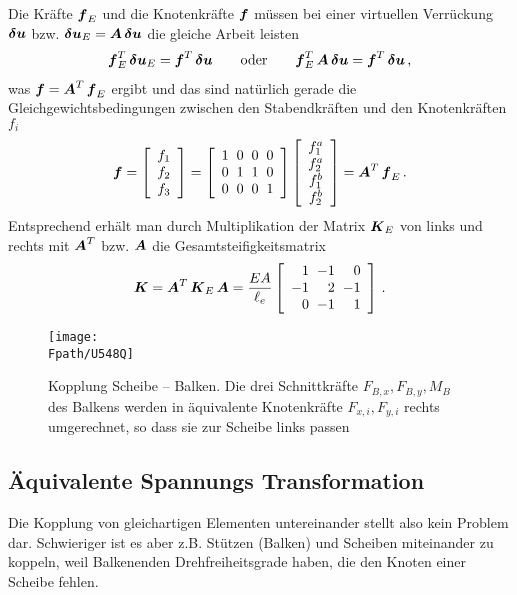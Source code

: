 Die Kr\"{a}fte $\mbox{\boldmath $f$}_E$ und die Knotenkr\"{a}fte $\mbox{\boldmath $f$}$ m\"{u}ssen bei einer virtuellen Verr\"{u}ckung $\mbox{\boldmath $\delta$} \mbox{\boldmath $u$}$ bzw. $\mbox{\boldmath $\delta$} \mbox{\boldmath $u$}_E = \mbox{\boldmath $A$}\,\mbox{\boldmath $\delta$} \mbox{\boldmath $u$}$ die gleiche Arbeit leisten
\begin{align}
\mbox{\boldmath $f$}_E^T\,\mbox{\boldmath $\delta$} \mbox{\boldmath $u$}_E = \mbox{\boldmath $f$}^T\,\mbox{\boldmath $\delta$} \mbox{\boldmath $u$} \qquad \text{oder} \qquad \mbox{\boldmath $f$}_E^T\,\mbox{\boldmath $A$}\,\mbox{\boldmath $\delta$}\mbox{\boldmath $u$} = \mbox{\boldmath $f$}^T\,\mbox{\boldmath $\delta$}\mbox{\boldmath $u$}\,,
\end{align}
was $\mbox{\boldmath $f$} = \mbox{\boldmath $A$}^T\,\mbox{\boldmath $f$}_E$ ergibt und das sind nat\"{u}rlich gerade die Gleichgewichtsbedingungen zwischen den Stabendkr\"{a}ften und den Knotenkr\"{a}ften $f_i$
\begin{align}
\vek f = \left[ \barr{c} f_1 \\ f_2 \\ f_3 \earr \right] = \left [
\barr {r @{\hspace{2mm}} r @{\hspace{2mm}} r @{\hspace{2mm}} r} 1 & 0 & 0 & 0 \\ 0 & 1 & 1 & 0 \\ 0 & 0 & 0 & 1 \earr \right] \left[ \barr{c} f_1^a \\ f_2^a \\ f_1^b \\ f_2^b \earr \right] = \vek A^T\,\vek f_E\,.
\end{align}
Entsprechend erh\"{a}lt man durch Multiplikation der Matrix $\mbox{\boldmath $K$}_E$ von links und rechts mit
$\mbox{\boldmath $A$}^T$ bzw. $\mbox{\boldmath $A$}$ die Gesamtsteifigkeitsmatrix
\begin{align}
\vek K = \vek A^T\,\vek K_E\,\vek A = \frac{EA}{\ell_e} \left [
\barr {r @{\hspace{2mm}} r @{\hspace{2mm}} r} 1 & -1 & 0  \\ -1 & 2 &-1 \\ 0 &-1 &1\earr \right]\,.
\end{align}

\begin{figure}[tbp]
\if {} \sidecaption[t] \fi
\centering
\texttt{[image: \\Fpath/U548Q]}
\caption{Kopplung Scheibe -- Balken. Die drei Schnittkr\"{a}fte $F_{B,x}, F_{B,y}, M_B$ des Balkens werden in \"{a}quivalente Knotenkr\"{a}fte $F_{x,i}, F_{y,i}$ rechts umgerechnet, so dass sie zur Scheibe links passen \cite{Werkle3} }
\label{U548}
\end{figure}%
\textcolor{chapterTitleBlue}{\section{\"{A}quivalente Spannungs Transformation}}\label{AST}
Die Kopplung von gleichartigen Elementen untereinander stellt also kein Problem dar. Schwieriger ist es aber z.B. St\"{u}tzen (Balken) und Scheiben miteinander zu koppeln, weil Balkenenden Drehfreiheitsgrade haben, die den Knoten einer Scheibe fehlen.

